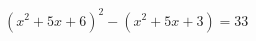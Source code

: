 \begin{ex}[type=equation]
	\begin{condition}
		$(x^2 +5x + 6)^2-(x^2 +5x + 3)  = 33$
	\end{condition}
\end{ex}